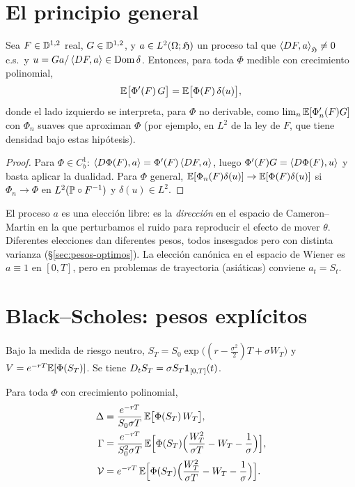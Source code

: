 \section{El principio general}

\begin{proposicion}\label{prop:pesos}
Sea $F\in\D^{1,2}$ real, $G\in\D^{1,2}$, y $a\in L^2(\Omega;\Hf)$ un
proceso tal que $\ip{DF}{a}_\Hf\ne0$ c.s.\ y $u=Ga/\ip{DF}{a}\in\Dom\delta$. Entonces, para toda $\Phi$ medible
con crecimiento polinomial,
\[
  \E\big[\Phi'(F)\,G\big]=\E\big[\Phi(F)\,\delta(u)\big],
\]
donde el lado izquierdo se interpreta, para $\Phi$ no derivable, como $\lim_n\E[\Phi_n'(F)G]$ con $\Phi_n$ suaves
que aproximan $\Phi$ (por ejemplo, en $L^2$ de la ley de $F$, que tiene densidad bajo estas hipótesis).
\end{proposicion}

\begin{proof}
Para $\Phi\in C_b^1$: $\ip{D\Phi(F)}{a}=\Phi'(F)\ip{DF}{a}$, luego $\Phi'(F)G=\ip{D\Phi(F)}{u}$ y basta
aplicar la dualidad. Para $\Phi$ general, $\E[\Phi_n(F)\delta(u)]\to\E[\Phi(F)\delta(u)]$ si $\Phi_n\to\Phi$ en $L^2(\P\circ F^{-1})$ y
$\delta(u)\in L^2$.
\end{proof}

\begin{intuicion}
El proceso $a$ es una elección libre: es la \emph{dirección} en el espacio de Cameron--Martin en
la que perturbamos el ruido para reproducir el efecto de mover $\theta$. Diferentes elecciones
dan diferentes pesos, todos insesgados pero con distinta varianza (§\ref{sec:pesos-optimos}). La elección
canónica en el espacio de Wiener es $a\equiv1$ en $[0,T]$, pero en problemas de trayectoria
(asiáticas) conviene $a_t=S_t$.
\end{intuicion}

\section{Black--Scholes: pesos explícitos}
Bajo la medida de riesgo neutro, $S_T=S_0\exp\big((r-\frac{\sigma^2}{2})T+\sigma W_T\big)$ y $V=e^{-rT}\E[\Phi(S_T)]$. Se tiene
$D_tS_T=\sigma S_T\ind_{[0,T]}(t)$.

\begin{proposicion}\label{prop:pesos-bs}
Para toda $\Phi$ con crecimiento polinomial,
\begin{align*}
  \Delta&=\frac{e^{-rT}}{S_0\sigma T}\,\E\big[\Phi(S_T)\,W_T\big],\\
  \Gamma&=\frac{e^{-rT}}{S_0^2\sigma T}\,\E\Big[\Phi(S_T)\Big(\frac{W_T^2}{\sigma T}-W_T-\frac1\sigma\Big)\Big],\\
  \mathcal V&=e^{-rT}\,\E\Big[\Phi(S_T)\Big(\frac{W_T^2}{\sigma T}-W_T-\frac1\sigma\Big)\Big].
\end{align*}
\end{proposicion}

